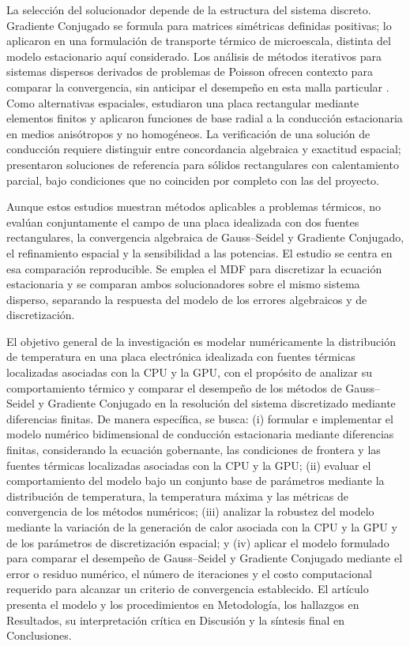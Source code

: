 La selecci\'on del solucionador depende de la estructura del sistema discreto. Gradiente Conjugado se formula para matrices sim\'etricas definidas positivas; \citet{zhang2001} lo aplicaron en una formulaci\'on de transporte t\'ermico de microescala, distinta del modelo estacionario aqu\'i considerado. Los an\'alisis de m\'etodos iterativos para sistemas dispersos derivados de problemas de Poisson ofrecen contexto para comparar la convergencia, sin anticipar el desempe\~no en esta malla particular \citep{xu2011poisson}. Como alternativas espaciales, \citet{akeremale2020finite} estudiaron una placa rectangular mediante elementos finitos y \citet{reutskiy2016meshless} aplicaron funciones de base radial a la conducci\'on estacionaria en medios anis\'otropos y no homog\'eneos. La verificaci\'on de una soluci\'on de conducci\'on requiere distinguir entre concordancia algebraica y exactitud espacial; \citet{beck2004verification} presentaron soluciones de referencia para s\'olidos rectangulares con calentamiento parcial, bajo condiciones que no coinciden por completo con las del proyecto.

Aunque estos estudios muestran m\'etodos aplicables a problemas t\'ermicos, no eval\'uan conjuntamente el campo de una placa idealizada con dos fuentes rectangulares, la convergencia algebraica de Gauss--Seidel y Gradiente Conjugado, el refinamiento espacial y la sensibilidad a las potencias. El estudio se centra en esa comparaci\'on reproducible. Se emplea el MDF para discretizar la ecuaci\'on estacionaria y se comparan ambos solucionadores sobre el mismo sistema disperso, separando la respuesta del modelo de los errores algebraicos y de discretizaci\'on.

El objetivo general de la investigaci\'on es modelar num\'ericamente la distribuci\'on de temperatura en una placa electr\'onica idealizada con fuentes t\'ermicas localizadas asociadas con la CPU y la GPU, con el prop\'osito de analizar su comportamiento t\'ermico y comparar el desempe\~no de los m\'etodos de Gauss--Seidel y Gradiente Conjugado en la resoluci\'on del sistema discretizado mediante diferencias finitas. De manera espec\'ifica, se busca: (i) formular e implementar el modelo num\'erico bidimensional de conducci\'on estacionaria mediante diferencias finitas, considerando la ecuaci\'on gobernante, las condiciones de frontera y las fuentes t\'ermicas localizadas asociadas con la CPU y la GPU; (ii) evaluar el comportamiento del modelo bajo un conjunto base de par\'ametros mediante la distribuci\'on de temperatura, la temperatura m\'axima y las m\'etricas de convergencia de los m\'etodos num\'ericos; (iii) analizar la robustez del modelo mediante la variaci\'on de la generaci\'on de calor asociada con la CPU y la GPU y de los par\'ametros de discretizaci\'on espacial; y (iv) aplicar el modelo formulado para comparar el desempe\~no de Gauss--Seidel y Gradiente Conjugado mediante el error o residuo num\'erico, el n\'umero de iteraciones y el costo computacional requerido para alcanzar un criterio de convergencia establecido. El art\'iculo presenta el modelo y los procedimientos en Metodolog\'ia, los hallazgos en Resultados, su interpretaci\'on cr\'itica en Discusi\'on y la s\'intesis final en Conclusiones.
